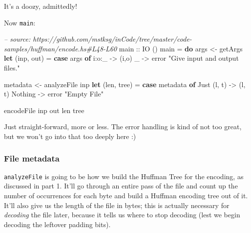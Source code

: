 \documentclass[]{article}
\newenvironment{Shaded}{}{}
\newcommand{\KeywordTok}[1]{\textcolor[rgb]{0.00,0.44,0.13}{\textbf{#1}}}
\newcommand{\DataTypeTok}[1]{\textcolor[rgb]{0.56,0.13,0.00}{#1}}
\newcommand{\StringTok}[1]{\textcolor[rgb]{0.25,0.44,0.63}{#1}}
\newcommand{\CommentTok}[1]{\textcolor[rgb]{0.38,0.63,0.69}{\textit{#1}}}
\newcommand{\OtherTok}[1]{\textcolor[rgb]{0.00,0.44,0.13}{#1}}
\newcommand{\FunctionTok}[1]{\textcolor[rgb]{0.02,0.16,0.49}{#1}}
\newcommand{\NormalTok}[1]{#1}
\begin{document}
It's a doozy, admittedly!

Now \texttt{main}:

\begin{Shaded}
\begin{Highlighting}[]
\CommentTok{-- source: https://github.com/mstksg/inCode/tree/master/code-samples/huffman/encode.hs#L48-L60}
\OtherTok{main ::} \DataTypeTok{IO}\NormalTok{ ()}
\NormalTok{main }\FunctionTok{=} \KeywordTok{do}
\NormalTok{    args     }\OtherTok{<-}\NormalTok{ getArgs}
    \KeywordTok{let}\NormalTok{ (inp, out)  }\FunctionTok{=} \KeywordTok{case}\NormalTok{ args }\KeywordTok{of}
\NormalTok{                        i}\FunctionTok{:}\NormalTok{o}\FunctionTok{:}\NormalTok{_      }\OtherTok{->}\NormalTok{ (i,o)}
\NormalTok{                        _          }\OtherTok{->}\NormalTok{ error }\StringTok{"Give input and output files."}

\NormalTok{    metadata }\OtherTok{<-}\NormalTok{ analyzeFile inp}
    \KeywordTok{let}\NormalTok{ (len, tree) }\FunctionTok{=} \KeywordTok{case}\NormalTok{ metadata }\KeywordTok{of}
                        \DataTypeTok{Just}\NormalTok{ (l, t) }\OtherTok{->}\NormalTok{ (l, t)}
                        \DataTypeTok{Nothing}     \OtherTok{->}\NormalTok{ error }\StringTok{"Empty File"}

\NormalTok{    encodeFile inp out len tree}
\end{Highlighting}
\end{Shaded}

Just straight-forward, more or less. The error handling is kind of not too
great, but we won't go into that too deeply here :)

\subsubsection{File metadata}\label{file-metadata}

\texttt{analyzeFile} is going to be how we build the Huffman Tree for the
encoding, as discussed in part 1. It'll go through an entire pass of the file
and count up the number of occurrences for each byte and build a Huffman
encoding tree out of it. It'll also give us the length of the file in bytes;
this is actually necessary for \emph{decoding} the file later, because it tells
us where to stop decoding (lest we begin decoding the leftover padding bits).
\end{document}
